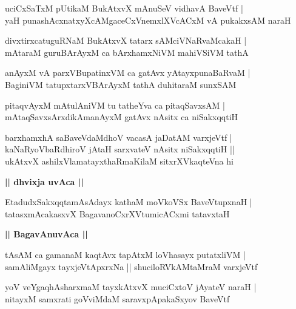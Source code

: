 \documentclass[twoside,12pt,openright]{book}
\newcounter{shloka}[chapter]
\def\uvaca#1{\centerline{{\large\textbf{#1}}}}
\begin{document}
\begin{shloka}%
uciCxSaTxM pUtikaM BukAtxvX mAnuSeV vidhavA BaveVtf |\\
yaH punashAcxnatxyXcAMgaceCxVnemxlXVcACxM vA pukakxsAM naraH 
\end{shloka}

\begin{shloka}%
divxtirxcatuguRNaM BukAtxvX tatarx sAMciVNaRvaMcakaH |\\
mAtaraM guruBArAyxM ca bArxhamxNiVM mahiVSiVM tathA 
\end{shloka}

\begin{shloka}%
anAyxM vA parxVBupatinxVM ca gatAvx yAtayxpunaBaRvaM |\\
BaginiVM tatupxtarxVBArAyxM tathA duhitaraM sunxSAM 
\end{shloka}

\begin{shloka}%
pitaqvAyxM mAtulAniVM tu tatheYva ca pitaqSavxsAM |\\
mAtaqSavxsArxdikAmanAyxM gatAvx nAsitx ca niSakxqqtiH 
\end{shloka}

\begin{shloka}%
barxhamxhA saBaveVdaMdhoV vacasA jaDatAM varxjeVtf |\\
kaNaRyoVbaRdhiroV jAtaH sarxvateV nAsitx niSakxqqtiH ||\\
ukAtxvX ashilxVlamatayxthaRmaKilaM sitxrXVkaqteVna hi
\end{shloka}

\uvaca{|| dhvixja uvAca ||}

\begin{shloka}%
EtadudxSakxqqtamAsAdayx kathaM moVkoVSx BaveVtupxnaH |\\
tatasxmAcakasxvX BagavanoCxrXVtumicACxmi tatavxtaH 
\end{shloka}

\uvaca{|| BagavAnuvAca ||}

\begin{shloka}%
tAsAM ca gamanaM kaqtAvx tapAtxM loVhasayx putatxliVM |\\
samAliMgayx tayxjeVtApxrxNa || shuciloRVkAMtaMraM varxjeVtf
\end{shloka}

\begin{shloka}%
yoV veYgaqhAsharxmaM tayxkAtxvX muciCxtoV jAyateV naraH |\\
nitayxM samxrati goVviMdaM saravxpApakaSxyov BaveVtf 
\end{shloka}
\end{document}
